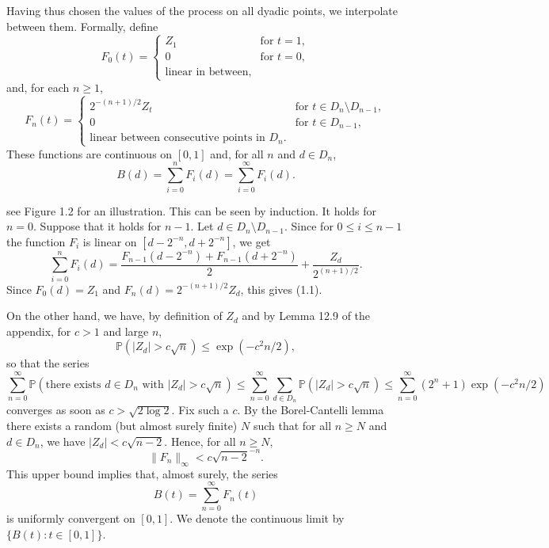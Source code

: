 \documentclass{article}
\begin{document}

Having thus chosen the values of the process on all dyadic points, we interpolate between them. Formally, define
\[
    F_0(t) = 
    \begin{cases} 
        Z_1 & \text{for } t = 1, \\
        0 & \text{for } t = 0, \\
        \text{linear in between}, 
    \end{cases}
\]
and, for each $n \geq 1$,
\[
    F_n(t) = 
    \begin{cases} 
        2^{-(n+1)/2} Z_t & \text{for } t \in D_n \setminus D_{n-1}, \\
        0 & \text{for } t \in D_{n-1}, \\
        \text{linear between consecutive points in } D_n.
    \end{cases}
\]
These functions are continuous on $[0, 1]$ and, for all $n$ and $d \in D_n$,
\[
    B(d) = \sum_{i=0}^{n} F_i(d) = \sum_{i=0}^{\infty} F_i(d). \tag{1.1}
\]


see Figure 1.2 for an illustration. This can be seen by induction. It holds for $n = 0$. Suppose that it holds for $n - 1$. Let $d \in D_n \setminus D_{n-1}$. Since for $0 \leq i \leq n - 1$ the function $F_i$ is linear on $[d - 2^{-n}, d + 2^{-n}]$, we get
\[
    \sum_{i=0}^{n} F_i(d) = \frac{F_{n-1}(d - 2^{-n}) + F_{n-1}(d + 2^{-n})}{2} + \frac{Z_d}{2^{(n+1)/2}}.
\]
Since $F_0(d) = Z_1$ and $F_n(d) = 2^{-(n+1)/2} Z_d$, this gives (1.1).

On the other hand, we have, by definition of $Z_d$ and by Lemma 12.9 of the appendix, for $c > 1$ and large $n$,
\[
    \mathbb{P}(|Z_d| > c\sqrt{n}) \leq \exp\left( -c^2 n / 2 \right),
\]
so that the series
\[
    \sum_{n=0}^{\infty} \mathbb{P} \left( \text{there exists } d \in D_n \text{ with } |Z_d| > c \sqrt{n} \right)
    \leq \sum_{n=0}^{\infty} \sum_{d \in D_n} \mathbb{P}(|Z_d| > c\sqrt{n})
    \leq \sum_{n=0}^{\infty} (2^n + 1) \exp\left( -c^2 n / 2 \right)
\]
converges as soon as $c > \sqrt{2 \log 2}$. Fix such a $c$. By the Borel-Cantelli lemma there exists a random (but almost surely finite) $N$ such that for all $n \geq N$ and $d \in D_n$, we have $|Z_d| < c \sqrt{n - 2}$. Hence, for all $n \geq N$,
\[
    \| F_n \|_{\infty} < c \sqrt{n - 2}^{-n}. \tag{1.2}
\]
This upper bound implies that, almost surely, the series
\[
    B(t) = \sum_{n=0}^{\infty} F_n(t)
\]
is uniformly convergent on $[0, 1]$. We denote the continuous limit by $\{ B(t) : t \in [0, 1] \}$.
\end{document}
